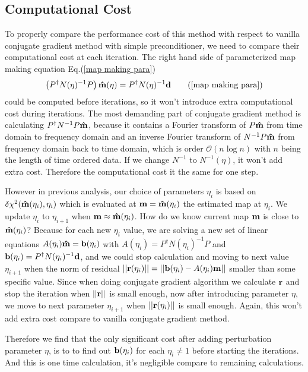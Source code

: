 \documentclass[11pt, letterpaper]{article}
\newcommand{\vbd}{\vb{d}}
\newcommand{\vbm}{\vb{m}}
\newcommand{\vbb}{\vb{b}}
\newcommand{\inv}[1]{#1^{-1}}
\newcommand{\hatm}{\vb{\hat{m}}}
\newcommand{\Pdagger}{P^{\dagger}}
\begin{document}
\subsection{Computational Cost}
To properly compare the performance cost of this method with respect to vanilla
conjugate gradient method with simple preconditioner,
we need to compare their computational cost at each iteration.
The right hand side of parameterized map making equation
Eq.(\ref{map making para})
\begin{align}
\qty(\Pdagger \inv{N(\eta)} P)\, \hatm(\eta) 
= \Pdagger \inv{N(\eta)} \vbd \tag{\ref{map making para}}
\end{align}
could be computed before iterations,
so it won't introduce extra computational cost during iterations.
The most demanding part of conjugate gradient method is calculating
$\Pdagger \inv{N} P \hatm$, because it contains a Fourier transform of
$P\hatm$ from time domain to frequency domain and an inverse Fourier transform
of $\inv{N} P \hatm$ from frequency domain back to time domain,
which is order $\mathcal{O}(n\log n)$ with $n$ being the length of time ordered
data.
If we change $\inv{N}$ to $\inv{N}(\eta)$, it won't add extra cost.
Therefore the computational cost it the same for one step.

However in previous analysis, our choice of parameters $\eta_i$ is based on
$\delta\chi^2(\hatm(\eta_i), \eta_i)$ which is evaluated at 
$\vbm = \hatm(\eta_i)$ the estimated map at $\eta_i$.
We update $\eta_i$ to $\eta_{i+1}$ when $\vbm \approx \hatm(\eta_i)$. 
How do we know current map $\vbm$ is close to $\hatm(\eta_i)$? 
Because for each new $\eta_i$ value, we are solving a new set of linear
equations $A(\eta_i) \hatm = \vbb(\eta_i)$ with
$A(\eta_i) = \Pdagger \inv{N(\eta_i)} P$ and 
$\vbb(\eta_i) = \Pdagger \inv{N(\eta_i)} \vbd$,
and we could stop calculation and moving to next value $\eta_{i+1}$ when the 
norm of residual 
$\qty||\vb{r}(\eta_i)|| = \qty||\vbb(\eta_i) - A(\eta_i) \vbm||$
smaller than some specific value.
Since when doing conjugate gradient algorithm we calculate $\vb{r}$ and stop
the iteration when $\qty||\vb{r}||$ is small enough, now after introducing
parameter $\eta$, we move to next parameter $\eta_{i+1}$ when 
$\qty||\vb{r}(\eta_i)||$ is small enough.
Again, this won't add extra cost compare to vanilla conjugate gradient method.

Therefore we find that the only significant cost after adding perturbation
parameter $\eta$, is to to find out $\vb{b}(\eta_i)$ for each $\eta_i\neq1$
before starting the iterations.
And this is one time calculation, it's negligible compare to remaining
calculations.
\end{document}
